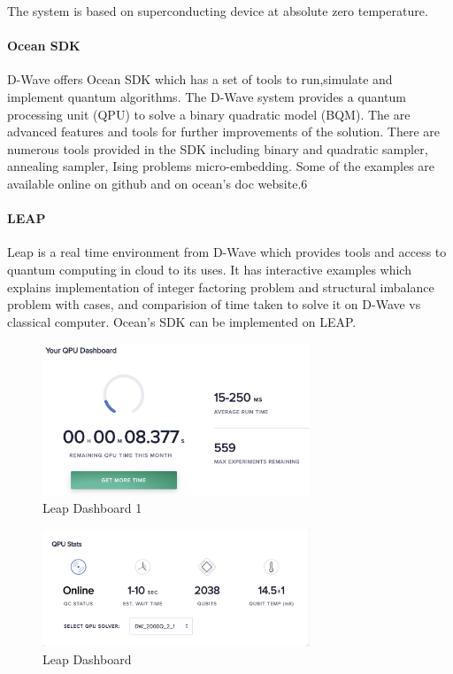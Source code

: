 \documentclass[12pt,conference]{IEEEtran}
\begin{document}
The system is based on superconducting device at absolute zero temperature.

\paragraph{Ocean SDK} D-Wave offers Ocean SDK which has a set of tools to run,simulate and implement quantum algorithms. The D-Wave system provides a quantum processing unit (QPU) to solve a binary quadratic model (BQM). The are advanced features and tools for further improvements of the solution. There are numerous tools provided in the SDK including binary and quadratic sampler, annealing sampler, Ising problems micro-embedding. Some of the examples are available online on github \cite{5} and on ocean's doc website.{6}

\paragraph{LEAP} Leap is a real time environment from D-Wave which provides tools and access to quantum computing in cloud to its uses. It has interactive examples which explains implementation of integer factoring problem and structural imbalance problem with cases, and comparision of time taken to solve it on D-Wave vs classical computer. Ocean's SDK can be implemented on LEAP.

\begin{figure}[h]
  \centering
  \includegraphics[width=8cm]{Leap-db1.png}
  \caption{Leap Dashboard 1}
  \label{fig:LDB}
\end{figure}

\begin{figure}[H]
  \centering
  \includegraphics[width=8cm]{Leap-db2.png}
  \caption{Leap Dashboard}
  \label{fig:LDB2}
\end{figure}
\end{document}
